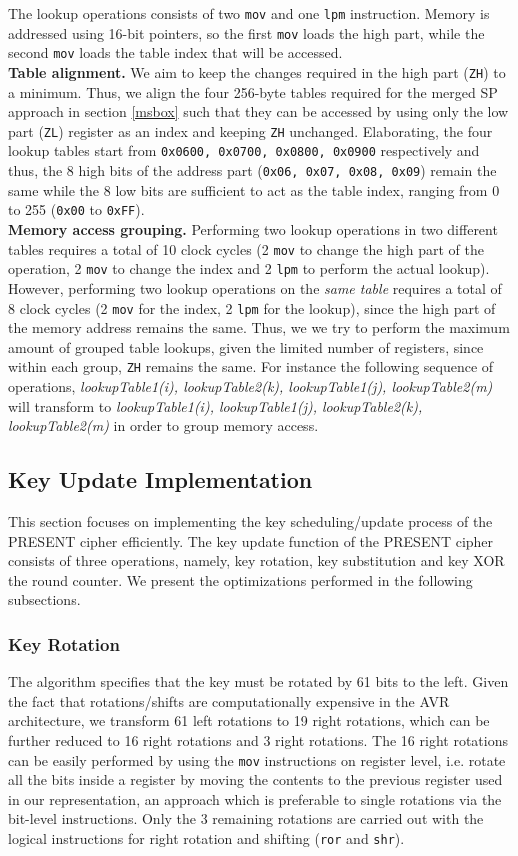 \documentclass[11pt]{llncs2e} %
\begin{document}
The lookup operations consists of two \texttt{mov} and one \texttt{lpm} instruction. Memory is addressed using 16-bit pointers, so the first \texttt{mov} loads the high part, while the second \texttt{mov} loads the table index that will be accessed.\\
\textbf{Table alignment.} We aim to keep the changes required in the high part (\texttt{ZH}) to a minimum. Thus, we align the four 256-byte tables required for the merged SP approach in section \ref{msbox} such that they can be accessed by using only the  low part (\texttt{ZL}) register as an index and keeping \texttt{ZH} unchanged. Elaborating, the four lookup tables start from \texttt{0x0600, 0x0700, 0x0800, 0x0900} respectively and thus, the 8 high bits of the address part (\texttt{0x06, 0x07, 0x08, 0x09}) remain the same while the 8 low bits are sufficient to act as the table index, ranging from 0 to 255 (\texttt{0x00} to \texttt{0xFF}). \\
\textbf{Memory access grouping.} Performing two lookup operations in two different tables requires a total of 10 clock cycles (2 \texttt{mov} to change the high part of the operation, 2 \texttt{mov} to change the index and 2 \texttt{lpm} to perform the actual lookup). However, performing two lookup operations on the \emph{same table} requires a total of 8 clock cycles (2 \texttt{mov} for the index, 2 \texttt{lpm} for the lookup), since the high part of the memory address remains the same. Thus, we 
we try to perform the maximum amount of grouped table lookups, given the limited number of registers, since within each group, \texttt{ZH} remains the same. For instance the following sequence of operations, \emph{ lookupTable1(i), lookupTable2(k), lookupTable1(j), lookupTable2(m)} will transform to \emph{ lookupTable1(i), lookupTable1(j), lookupTable2(k), lookupTable2(m)} in order to group memory access.
\subsection{Key Update Implementation}
This section focuses on implementing the key scheduling/update process of the PRESENT cipher efficiently. The key update function of the PRESENT cipher consists of three operations, namely, key rotation, key substitution and key XOR the round counter. We present the optimizations performed in the following subsections.
\subsubsection{Key Rotation}
The algorithm specifies that the key must be rotated by 61 bits to the left. Given the fact that rotations/shifts are computationally expensive in the AVR architecture, we transform 61 left rotations to 19 right rotations, which can be further reduced to 16 right rotations and 3 right rotations. The 16 right rotations can be easily performed by using the \texttt{mov} instructions on register level, i.e. rotate all the bits inside a register by moving the contents to the previous register used in our representation, an approach which is preferable to single rotations via the bit-level instructions. Only the 3 remaining rotations are carried out with the logical instructions for right rotation and shifting (\texttt{ror} and \texttt{shr}).
\end{document}
